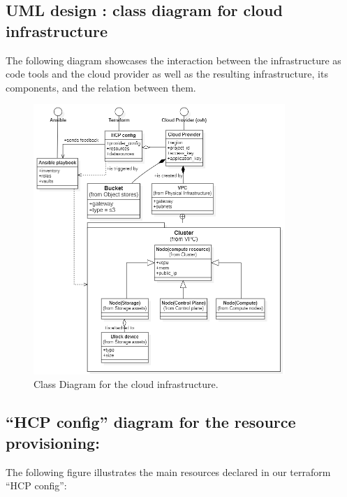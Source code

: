 \subsection{UML design : class diagram for cloud infrastructure }
\hspace{7mm}The following diagram showcases the interaction between the infrastructure as code tools and the cloud provider as well as the resulting infrastructure, its components, and the relation between them. 
\begin{figure}[H]\centering
\includegraphics[width=0.85\textwidth,angle=00]{assets/f13.png}
\caption{Class Diagram for the cloud infrastructure.}
\label{fig:fig13}
\end{figure}

\subsection{“HCP config” diagram for the resource provisioning: }

\hspace{7mm}The following figure illustrates the main resources declared in our terraform “HCP config”: 

